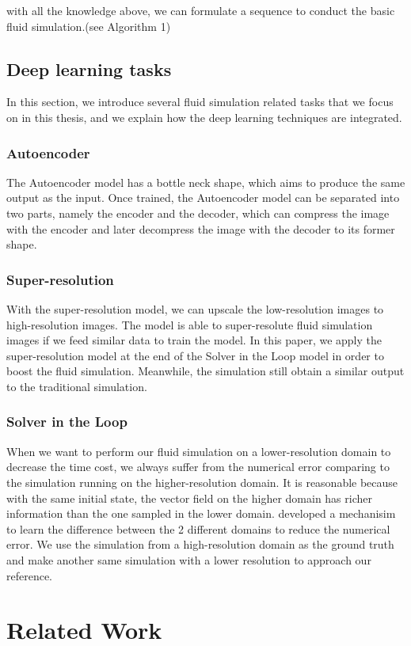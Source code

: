 \documentclass[a4paper,12pt,twoside]{report}
\begin{document}
with all the knowledge above, we can formulate a sequence to conduct the basic fluid simulation.(see Algorithm 1)


\section{Deep learning tasks}
In this section, we introduce several fluid simulation related tasks that we focus on in this thesis, and we explain how the deep learning techniques are integrated.
\subsection{Autoencoder}
The Autoencoder model has a bottle neck shape, which aims to produce the same output as the input. Once trained, the Autoencoder model can be separated into two parts, namely the encoder and the decoder, which can compress the image with the encoder and later decompress the image with the decoder to its former shape.
\subsection{Super-resolution}
With the super-resolution model, we can upscale the low-resolution images to high-resolution images. The model is able to super-resolute fluid simulation images if we feed similar data to train the model. In this paper, we apply the super-resolution model at the end of the Solver in the Loop model in order to boost the fluid simulation. Meanwhile, the simulation still obtain a similar output to the traditional simulation.
\subsection{Solver in the Loop}
When we want to perform our fluid simulation on a lower-resolution domain to decrease the time cost, we always suffer from the numerical error comparing to the simulation running on the higher-resolution domain. It is reasonable because with the same initial state, the vector field on the higher domain has richer information than the one sampled in the lower domain. \citeauthor{um2020sol} developed a mechanisim to learn the difference between the 2 different domains to reduce the numerical error.  We use the simulation from a high-resolution domain as the ground truth and make another same simulation with a lower resolution to approach our reference.  




\chapter{Related Work}
\end{document}
